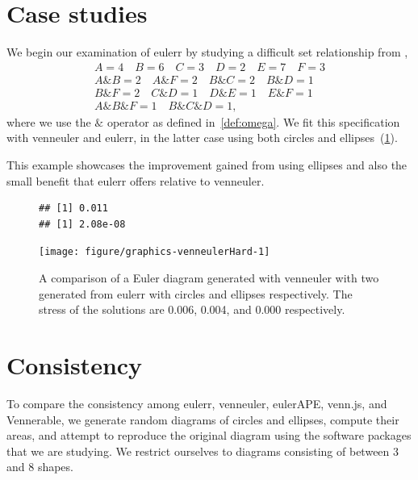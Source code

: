 \documentclass[
  oneside,
  openany,
  numbers=noendperiod,
  parskip=half,
  bibliography=totoc
]{scrbook}\usepackage[]{graphicx}\usepackage{xcolor}
\makeatletter
\newenvironment{kframe}{%
 \def\at@end@of@kframe{}%
 \ifinner\ifhmode%
  \def\at@end@of@kframe{\end{minipage}}%
  \begin{minipage}{\columnwidth}%
 \fi\fi%
 \def\FrameCommand##1{\hskip\@totalleftmargin \hskip-\fboxsep
 \colorbox{shadecolor}{##1}\hskip-\fboxsep
     \hskip-\linewidth \hskip-\@totalleftmargin \hskip\columnwidth}%
 \MakeFramed {\advance\hsize-\width
   \@totalleftmargin\z@ \linewidth\hsize
   \@setminipage}}%
 {\par\unskip\endMakeFramed%
 \at@end@of@kframe}
\newenvironment{knitrout}{}{} %
\newcommand{\pkg}[1]{{\fontseries{b}\selectfont #1}}
\makeatother
\begin{document}
\section{Case studies}
\label{sec:caseStudies}

We begin our examination of \pkg{eulerr} by studying a difficult set
relationship from \citet{wilkinson_2012},
\begin{gather*}
A = 4 \quad B = 6 \quad C = 3 \quad D = 2 \quad E = 7 \quad F = 3\\
A\& B = 2 \quad A\&F = 2 \quad B\& C = 2 \quad B\&D = 1 \\
B\& F = 2 \quad C\&D = 1 \quad D\& E = 1 \quad E\&F = 1 \\
A\&B\&F = 1 \quad B\&C\&D = 1,\end{gather*}
where we use the $\&$ operator as defined in~\cref{def:omega}. We fit this
specification with \pkg{venneuler} and \pkg{eulerr}, in the latter case using
both circles and ellipses~(\cref{fig:venneulerHard}).

This example showcases the improvement gained from using ellipses and also the
small benefit that \pkg{eulerr} offers relative to \pkg{venneuler}.

\begin{figure}[thb]
\begin{knitrout}\small
{}\color{fgcolor}\begin{kframe}
\begin{verbatim}
## [1] 0.011
## [1] 2.08e-08
\end{verbatim}
\end{kframe}

{\centering \texttt{[image: figure/graphics-venneulerHard-1]} 

}



\end{knitrout}
\caption{A comparison of a Euler diagram generated with \pkg{venneuler} with two
generated from \pkg{eulerr} with circles and ellipses respectively. The stress
of the solutions are 0.006, 0.004, and 0.000 respectively.}
\label{fig:venneulerHard}
\end{figure}

\section{Consistency}
\label{sec:consistency}

To compare the consistency among \pkg{eulerr}, \pkg{venneuler}, \pkg{eulerAPE},
\pkg{venn.js}, and \pkg{Vennerable}, we generate random diagrams of circles and
ellipses, compute their areas, and attempt to reproduce the original diagram
using the software packages that we are studying. We restrict ourselves to
diagrams consisting of between 3 and 8 shapes.
\end{document}
